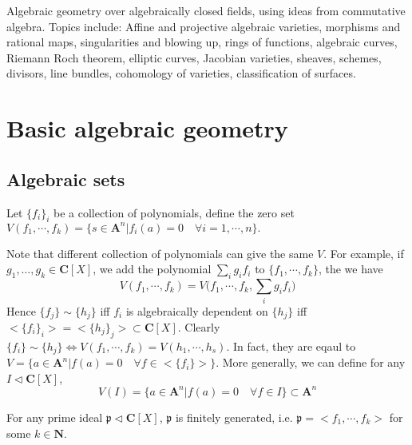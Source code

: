 \documentclass[
11pt, %
letterpaper， %
oneside, %
headinclude,footinclude, %
BCOR5mm, %
]{scrartcl}
\newcommand{\C}{{\mathbf{C}}}
\newcommand{\N}{{\mathbf{N}}}
\newcommand{\A}{{\mathbf{A}}}
\newcommand{\p}{{\mathfrak{p}}}
\begin{document}
Algebraic geometry over algebraically closed fields, using ideas from commutative algebra. Topics include: Affine and projective algebraic varieties, morphisms and rational maps, singularities and blowing up, rings of functions, algebraic curves, Riemann Roch theorem, elliptic curves, Jacobian varieties, sheaves, schemes, divisors, line bundles, cohomology of varieties, classification of surfaces.


{\let\thefootnote\relax{}}




\newpage %

\section{Basic algebraic geometry}
\subsection{Algebraic sets}
\begin{definition}Let $\{f_i\}_{i}$ be a collection of polynomials, define the zero set $V(f_1, \cdots, f_k)=\{ s\in \A^n| f_i(a)=0\quad \forall i=1,\cdots, n  \}.$
	\end{definition}
Note that different collection of polynomials can give the same $V$. For example, if $g_1,\dots,g_k \in \C [X]$, we add the polynomial $\sum_i g_if_i$ to $\{f_1,\cdots, f_k \}$, the we have 
\begin{equation*}
V(f_1, \cdots, f_k)=V\Big(f_1, \cdots, f_k, \sum_i g_if_i\Big)
\end{equation*}
Hence $\{f_j\}\sim \{ h_j\}$ iff $f_i$ is algebraically dependent on $\{h_j\}$ iff $<\{f_i\}_i>=<\{h_j\}_j> \subset \C[X]$. Clearly $\{f_i\}\sim \{h_j\} \Leftrightarrow V(f_1, \cdots, f_k)=V(h_1, \cdots, h_s)$. In fact, they are eqaul to $V=\{a\in \A^n| f(a)=0\quad \forall f\in <\{f_i \}>\}$. More generally, we can define for any $I \lhd \C[X]$,
\begin{equation*}
V(I)=\{a\in \A^n| f(a)=0 \quad \forall f\in I \}\subset \A^n
\end{equation*} 
\begin{thm}
For any prime ideal $\p \lhd \C [X]$, $\p$ is finitely generated, i.e. $\p=<f_1, \cdots, f_k>$ for some $k\in \N$.
\end{thm}
\end{document}
